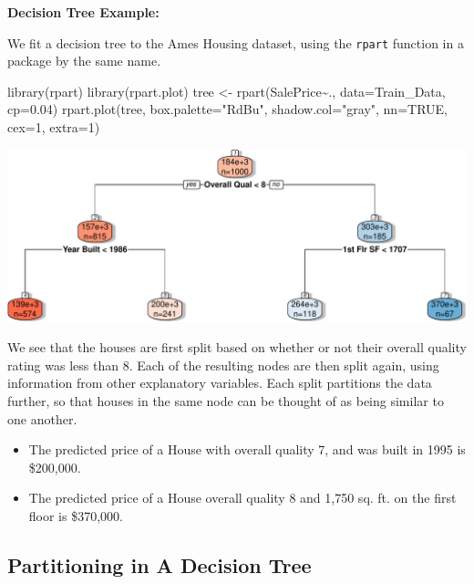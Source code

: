 \documentclass[
  letterpaper,
  DIV=11,
  numbers=noendperiod]{scrreprt}
\newenvironment{Shaded}{\begin{snugshade}}{\end{snugshade}}
\newcommand{\AttributeTok}[1]{\textcolor[rgb]{0.40,0.45,0.13}{#1}}
\newcommand{\ConstantTok}[1]{\textcolor[rgb]{0.56,0.35,0.01}{#1}}
\newcommand{\DecValTok}[1]{\textcolor[rgb]{0.68,0.00,0.00}{#1}}
\newcommand{\FloatTok}[1]{\textcolor[rgb]{0.68,0.00,0.00}{#1}}
\newcommand{\FunctionTok}[1]{\textcolor[rgb]{0.28,0.35,0.67}{#1}}
\newcommand{\NormalTok}[1]{\textcolor[rgb]{0.00,0.23,0.31}{#1}}
\newcommand{\OtherTok}[1]{\textcolor[rgb]{0.00,0.23,0.31}{#1}}
\newcommand{\SpecialCharTok}[1]{\textcolor[rgb]{0.37,0.37,0.37}{#1}}
\newcommand{\StringTok}[1]{\textcolor[rgb]{0.13,0.47,0.30}{#1}}
\begin{document}
\textbf{Decision Tree Example:}

We fit a decision tree to the Ames Housing dataset, using the
\texttt{rpart} function in a package by the same name.

\begin{Shaded}
\begin{Highlighting}[]
\FunctionTok{library}\NormalTok{(rpart)}
\FunctionTok{library}\NormalTok{(rpart.plot)}
\NormalTok{tree }\OtherTok{\textless{}{-}} \FunctionTok{rpart}\NormalTok{(SalePrice}\SpecialCharTok{\textasciitilde{}}\NormalTok{., }\AttributeTok{data=}\NormalTok{Train\_Data, }\AttributeTok{cp=}\FloatTok{0.04}\NormalTok{)}
\FunctionTok{rpart.plot}\NormalTok{(tree, }\AttributeTok{box.palette=}\StringTok{"RdBu"}\NormalTok{, }\AttributeTok{shadow.col=}\StringTok{"gray"}\NormalTok{, }\AttributeTok{nn=}\ConstantTok{TRUE}\NormalTok{, }\AttributeTok{cex=}\DecValTok{1}\NormalTok{, }\AttributeTok{extra=}\DecValTok{1}\NormalTok{)}
\end{Highlighting}
\end{Shaded}

\includegraphics{Ch7_files/figure-pdf/unnamed-chunk-49-1.pdf}

We see that the houses are first split based on whether or not their
overall quality rating was less than 8. Each of the resulting nodes are
then split again, using information from other explanatory variables.
Each split partitions the data further, so that houses in the same node
can be thought of as being similar to one another.

\begin{itemize}
\item
  The predicted price of a House with overall quality 7, and was built
  in 1995 is \$200,000.
\item
  The predicted price of a House overall quality 8 and 1,750 sq. ft. on
  the first floor is \$370,000.
\end{itemize}

\subsection{Partitioning in A Decision
Tree}\label{partitioning-in-a-decision-tree}
\end{document}
